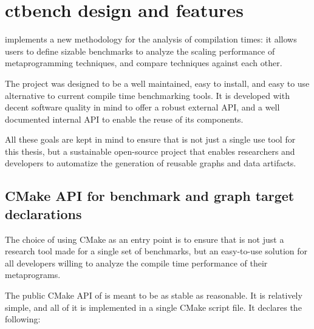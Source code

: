 \documentclass[../main]{subfiles}
\begin{document}
\section{
  ctbench design and features
}

\ctbench implements a new methodology for the analysis of compilation times:
it allows users to define \cpp sizable benchmarks to analyze the scaling
performance of \cpp metaprogramming techniques, and compare techniques
against each other.

The project was designed to be a well maintained, easy to install,
and easy to use alternative to current compile time benchmarking tools.
It is developed with decent software quality in mind to offer a robust
external API, and a well documented internal API to enable the reuse of
its components.

All these goals are kept in mind to ensure that \ctbench is not just a single
use tool for this thesis, but a sustainable open-source project that enables
researchers and developers to automatize the generation of reusable graphs
and data artifacts.

\subsection{
  CMake API for benchmark and graph target declarations
}
\label{lbl:ctbench-cmake-api}

The choice of using CMake as an entry point is to ensure that \ctbench is not
just a research tool made for a single set of benchmarks, but an easy-to-use
solution for all \cpp developers willing to analyze the compile time
performance of their metaprograms.

The public CMake API of \ctbench is meant to be as stable as reasonable.
It is relatively simple, and all of it is implemented in
a single CMake script file. It declares the following:
\end{document}
